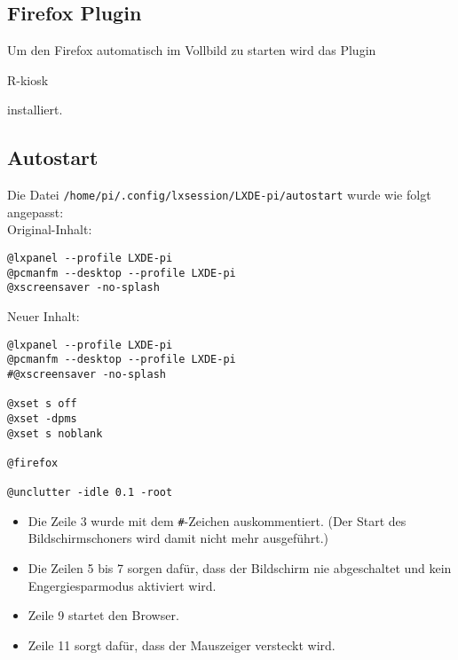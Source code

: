 \subsection{Firefox Plugin}
Um den Firefox automatisch im Vollbild zu starten wird das Plugin \begin{em}R-kiosk\end{em} \cite{rkiosk} installiert.

\subsection{Autostart}
\label{sec:autostartconf}
Die Datei \lstinline|/home/pi/.config/lxsession/LXDE-pi/autostart| wurde wie folgt angepasst:\\
Original-Inhalt:
\begin{lstlisting}
@lxpanel --profile LXDE-pi
@pcmanfm --desktop --profile LXDE-pi
@xscreensaver -no-splash
\end{lstlisting}
Neuer Inhalt:
\begin{lstlisting}
@lxpanel --profile LXDE-pi
@pcmanfm --desktop --profile LXDE-pi
#@xscreensaver -no-splash

@xset s off
@xset -dpms
@xset s noblank

@firefox

@unclutter -idle 0.1 -root
\end{lstlisting}
\begin{itemize}
	\item {Die Zeile 3 wurde mit dem \lstinline|#|-Zeichen auskommentiert. (Der Start des Bildschirmschoners wird damit nicht mehr ausgeführt.)}
	\item {Die Zeilen 5 bis 7 sorgen dafür, dass der Bildschirm nie abgeschaltet und kein Engergiesparmodus aktiviert wird.}
	\item {Zeile 9 startet den Browser.}
	\item {Zeile 11 sorgt dafür, dass der Mauszeiger versteckt wird.}
\end{itemize}

